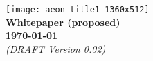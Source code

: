 
\newcommand{\titlesize}{\fontsize{32pt}{20pt}\selectfont}

\begin{titlepage}
	\vspace*{48pt}
	\centering
	\texttt{[image: aeon\_title1\_1360x512]}
	\\
	\vspace{80pt}
	{\titlesize \textbf{Whitepaper (proposed)}}
	\\
	\vspace{36pt}
	\textbf{\today}
	\\
	\vspace{18pt}
	{\small\em (DRAFT Version 0.02)}

\end{titlepage}